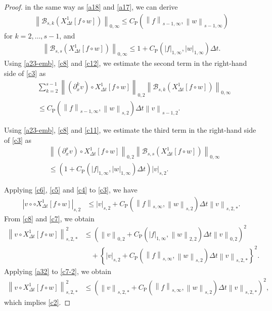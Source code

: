\documentclass[10pt,a4paper,tbtags,leqno]{amsart}
\theoremstyle{definition}
\numberwithin{equation}{section}
\def\norm#1#2{\left\|#2\right\|_{#1}}
\def\snorm#1#2{\left|#2\right|_{#1}}
\begin{document}
\begin{proof}
  in the same way as \eqref{a18} and \eqref{a17}, we can derive 
  \begin{align} 
    \norm{0, \infty}{\mathcal{B}_{s, k} ({X_{\Delta t}^1} [f \circ w])} \leq C_{\mathrm{P}} (\norm{s - 1, \infty}{f}, \norm{s - 1, \infty}{w}) \label{c12}
  \end{align} 
  for $ k = 2, \ldots, s - 1 $, and 
  \begin{align}
    \norm{0, \infty}{\mathcal{B}_{s, s} ({X_{\Delta t}^1} [f \circ w])} \leq 1 +  C_{\mathrm{P}} (\snorm{1, \infty}{f}, \snorm{1, \infty}{w}) \Delta t. \label{c11}
  \end{align} 
  Using \eqref{a23-emb}, \eqref{c8} and \eqref{c12}, we estimate the second term in the right-hand side of \eqref{c3} as 
  \begin{align} 
    & \sum_{k=2}^{s - 1} \norm{0, 2}{(\partial_x^k v) \circ {X_{\Delta t}^1} [f \circ w]} \norm{0, \infty}{\mathcal{B}_{s, k} ({X_{\Delta t}^1} [f \circ w])} \\
    & \leq C_{\mathrm{P}} (\norm{s - 1, \infty}{f}, \norm{s, 2}{w}) \Delta t \norm{s - 1, 2}{v}. \label{c5}
  \end{align}

  Using \eqref{a23-emb}, \eqref{c8} and \eqref{c11}, we estimate the third term in the right-hand side of \eqref{c3} as 
  \begin{align} 
    & \norm{0, 2}{(\partial_x^s v) \circ {X_{\Delta t}^1} [f \circ w]} \norm{0, \infty}{\mathcal{B}_{s, s} ({X_{\Delta t}^1} [f \circ w])} \\
    & \leq \left(1 + C_{\mathrm{P}} (\snorm{1, \infty}{f}, \snorm{1, \infty}{w}) \Delta t\right) \snorm{s, 2}{v}. \label{c4}
  \end{align} 

  Applying \eqref{c6}, \eqref{c5} and \eqref{c4} to \eqref{c3}, we have 
  \begin{align} 
    \snorm{s, 2}{v \circ  \circ {X_{\Delta t}^1} [f \circ w]} & \leq \snorm{s, 2}{v} + C_{\mathrm{P}} (\norm{s, \infty}{f}, \norm{s, 2}{w}) \Delta t \norm{s, 2, \ast}{v}. \label{c7} 
  \end{align}
  From \eqref{c8} and \eqref{c7}, we obtain 
  \begin{align}
    \norm{s, 2, \ast}{v \circ {X_{\Delta t}^1} [f \circ w]}^2 & \leq \left(\norm{0, 2}{v} + C_{\mathrm{P}} (\snorm{1, \infty}{f}, \norm{2, 2}{w}) \Delta t \norm{0, 2}{v}\right)^2 \\
    & \quad + \left\{\snorm{s, 2}{v} + C_{\mathrm{P}} (\norm{s, \infty}{f}, \norm{s, 2}{w}) \Delta t \norm{s, 2, \ast}{v}\right\}^2. \label{c7-2} 
  \end{align} 
  Applying \eqref{a32} to \eqref{c7-2}, we obtain 
  \begin{align}
    \norm{s, 2, \ast}{v \circ {X_{\Delta t}^1} [f \circ w]}^2 & \leq \left(\norm{s, 2, \ast}{v} +  C_{\mathrm{P}} (\norm{s, \infty}{f}, \norm{s, 2}{w}) \Delta t \norm{s, 2, \ast}{v}\right)^2, 
  \end{align} 
  which implies \eqref{c2}. 


\end{proof}
\end{document}
